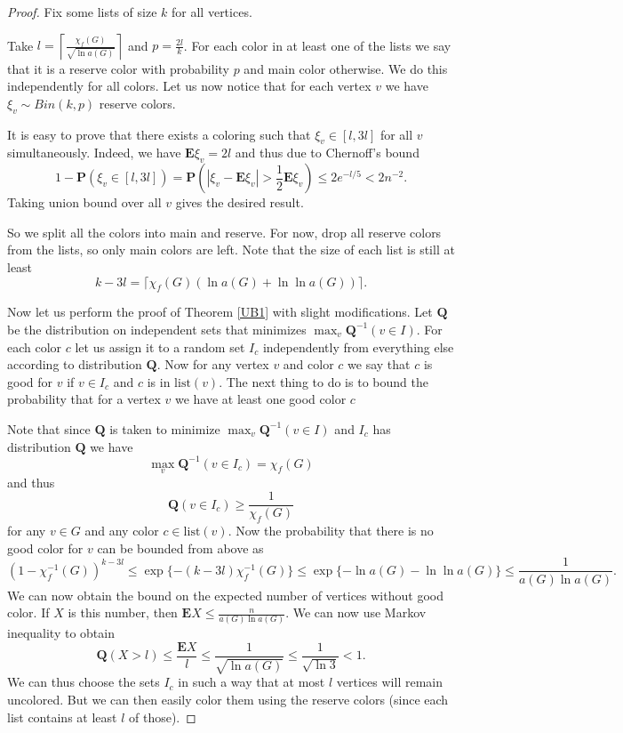 \documentclass[10pt,a4paper]{article}
\theoremstyle{remark}
\theoremstyle{definition}
\newcommand{\mP}{\mathbf{P}}
\newcommand{\mQ}{\mathbf{Q}}
\newcommand{\mE}{\mathbf{E}}
\newcommand{\lst}{\mathrm{list}}
\newcommand{\skob}[1]{\left(#1\right)}
\begin{document}
\begin{proof}
    Fix some lists of size $k$ for all vertices.
    
    Take $l = \left\lceil\frac{\chi_f(G)}{\sqrt{\ln a(G)}}\right\rceil$ and $p = \frac{2l}{k}$. For each color in at least one of the lists we say that it is a reserve color with probability $p$ and main color otherwise. We do this independently for all colors. Let us now notice that for each vertex $v$ we have $\xi_v \sim Bin(k,p)$ reserve colors. 

    It is easy to prove that there exists a coloring such that $\xi_v \in [l, 3l]$ for all $v$ simultaneously. Indeed, we have $\mE \xi_v = 2l$ and thus due to Chernoff's bound
    $$
       1-\mP(\xi_v \in [l, 3l]) = \mP\skob{|\xi_v - \mE\xi_v| > \frac{1}{2}\mE\xi_v} \leq 2e^{-l/5} < 2n^{-2}.
    $$
    Taking union bound over all $v$ gives the desired result.

    So we split all the colors into main and reserve. For now, drop all reserve colors from the lists, so only main colors are left. Note that the size of each list is still at least 
    $$
        k - 3l = \lceil\chi_f(G)\skob{\ln a(G) + \ln \ln a(G)}\rceil.
    $$

    Now let us perform the proof of Theorem \ref{UB1} with slight modifications. Let $\mathbf{Q}$ be the distribution on independent sets that minimizes $\max_{v} \mQ^{-1}(v \in I)$. For each color $c$ let us assign it to a random set $I_c$ independently from everything else according to distribution $\mQ$. Now for any vertex $v$ and color $c$ we say that $c$ is good for $v$ if $v \in I_c$ and $c$ is in $\lst(v)$. The next thing to do is to bound the probability that for a vertex $v$ we have at least one good color $c$
    
    Note that since $\mQ$ is taken to minimize $\max_{v} \mQ^{-1}(v \in I)$ and $I_c$ has distribution $\mQ$ we have $$\max_{v} \mQ^{-1}(v \in I_c) = \chi_f(G)$$ and thus
    $$
        \mQ(v \in I_c) \geq \frac{1}{\chi_f(G)}
    $$
    for any $v \in G$ and any color $c \in \lst(v)$. Now the probability that there is no good color for $v$ can be bounded from above as 
    $$
    (1 - \chi_f^{-1}(G))^{k-3l} \leq \exp\{-(k-3l)\chi_f^{-1}(G)\} \leq \exp\{-\ln a(G) - \ln \ln a(G)\} \leq \frac{1}{a(G)\ln a(G)}.
    $$
    We can now obtain the bound on the expected number of vertices without good color. If $X$ is this number, then $\mE X \leq \frac{n}{a(G)\ln a(G)}$. We can now use Markov inequality to obtain
    $$
        \mQ(X > l) \leq \frac{\mE X}{l} \leq \frac{1}{\sqrt{\ln a(G)}} \leq \frac{1}{\sqrt{\ln 3}} < 1.
    $$
    We can thus choose the sets $I_c$ in such a way that at most $l$ vertices will remain uncolored. But we can then easily color them using the reserve colors (since each list contains at least $l$ of those). 
\end{proof}




\end{document}
